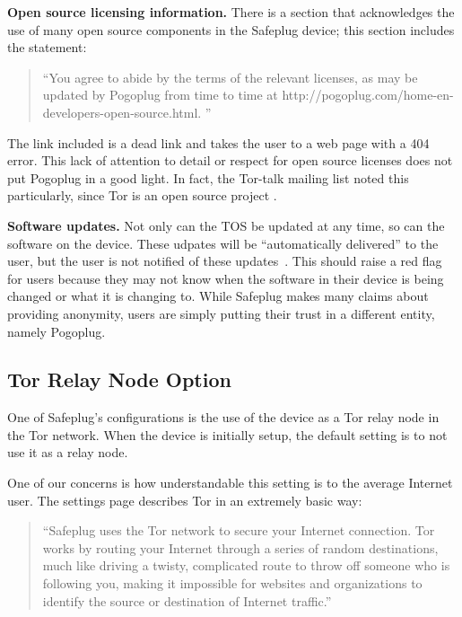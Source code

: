 \documentclass[conference]{IEEEtran}
\begin{document}
{\bf Open source licensing information.}  There is a section that acknowledges the use of many open source components in the Safeplug device; this section includes the statement: 

\begin{quotation}
``You agree to abide by the terms of the relevant licenses, as may be updated by Pogoplug from time to time at http://pogoplug.com/home-en-developers-open-source.html. '' \cite{safeplug}
\end{quotation}

The link included is a dead link and takes the user to a web page with a 404 error.  This lack of attention to detail or respect for open source licenses does not put Pogoplug in a good light.  In fact, the Tor-talk mailing list noted this particularly, since Tor is an open source project \cite{tormailinglist}.

{\bf Software updates.} Not only can the TOS be updated at any time, so can the software on the device.  These udpates will be ``automatically delivered'' to the user, but the user is not notified of these updates~\cite{safeplug}.  This should raise a red flag for users because they may not know when the software in their device is being changed or what it is changing to.  While Safeplug makes many claims about providing anonymity, users are simply putting their trust in a different entity, namely Pogoplug.

\subsection{Tor Relay Node Option}
\label{port9001}
One of Safeplug's configurations is the use of the device as a Tor relay node in the Tor network.  When the device is initially setup, the default setting is to not use it as a relay node.  

One of our concerns is how understandable this setting is to the average Internet user.  The settings page describes Tor in an extremely basic way:

\begin{quotation}
``Safeplug uses the Tor network to secure your Internet connection.  Tor works by routing your Internet through a series of random destinations, much like driving a twisty, complicated route to throw off someone who is following you, making it impossible for websites and organizations to identify the source or destination of Internet traffic.'' \cite{safeplug}
\end{quotation}
\end{document}
